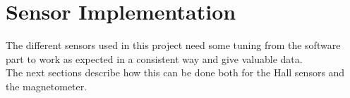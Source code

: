 \chapter{Sensor Implementation}\label{chap:sensorsImplementation}
The different sensors used in this project need some tuning from the software part to work as expected in a consistent way and give valuable data.\\
The next sections describe how this can be done both for the Hall sensors and the magnetometer.